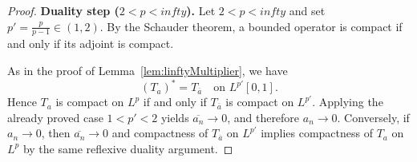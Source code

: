 \documentclass[10pt,a4paper]{amsart}
\def\infty{infty}%
\begin{document}
\begin{proof}
\medskip
\textbf{Duality step ($2<p<\infty$).}
Let $2<p<\infty$ and set $p'=\frac{p}{p-1}\in(1,2)$.
By the Schauder theorem, a bounded operator is compact if and only if its adjoint is compact.

As in the proof of Lemma~\ref{lem:linftyMultiplier}, we have
\[
(T_a)^* = T_{\overline a}\quad \text{on }L^{p'}[0,1].
\]
Hence $T_a$ is compact on $L^p$ if and only if $T_{\overline a}$ is compact on $L^{p'}$.
Applying the already proved case $1<p'<2$ yields $\overline{a_n}\to0$, and therefore $a_n\to0$.
Conversely, if $a_n\to0$, then $\overline{a_n}\to0$ and compactness of $T_{\overline a}$ on $L^{p'}$
implies compactness of $T_a$ on $L^p$ by the same reflexive duality argument.
\end{proof}
\end{document}
